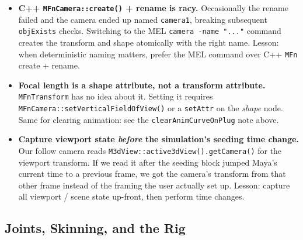 \documentclass[12pt]{article}
\begin{document}
\begin{itemize}
  \item \textbf{C++ \texttt{MFnCamera::create()} + rename is racy.}
    Occasionally the rename failed and the camera ended up named
    \texttt{camera1}, breaking subsequent \texttt{objExists} checks.
    Switching to the MEL \texttt{camera -name "..."} command creates the
    transform and shape atomically with the right name.  Lesson: when
    deterministic naming matters, prefer the MEL command over C++
    \texttt{MFn} create + rename.

  \item \textbf{Focal length is a shape attribute, not a transform attribute.}
    \texttt{MFnTransform} has no idea about it.  Setting it requires
    \texttt{MFnCamera::setVerticalFieldOfView()} or a \texttt{setAttr} on
    the \emph{shape} node.  Same for clearing animation: see the
    \texttt{clearAnimCurveOnPlug} note above.

  \item \textbf{Capture viewport state \emph{before} the simulation's
    seeding time change.}  Our follow camera reads
    \texttt{M3dView::active3dView().getCamera()} for the viewport
    transform.  If we read it after the seeding block jumped Maya's
    current time to a previous frame, we got the camera's transform from
    that other frame instead of the framing the user actually set up.
    Lesson: capture all viewport / scene state up-front, then perform
    time changes.
\end{itemize}

\subsection*{Joints, Skinning, and the Rig}
\end{document}
